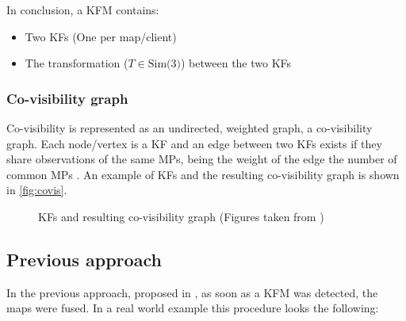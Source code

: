 In conclusion, a \ac{KFM} contains:
\begin{itemize}
  \item Two \acp{KF} (One per map/client)
  \item The transformation ($T \in \text{Sim(3)}$) between the two \acp{KF}
\end{itemize}

\subsubsection{Co-visibility graph}
Co-visibility is represented as an undirected, weighted graph, a co-visibility graph. Each node/vertex is a \ac{KF} and an edge between two \acp{KF} exists if they share observations of the same \acp{MP}, being the weight of the edge the number of common \acp{MP} \cite{Mur-Artal2015}. An example of \acp{KF} and the resulting co-visibility graph is shown in \autoref{fig:covis}.

\begin{figure}[H]
	\centering
	\quad
	\caption{\acp{KF} and resulting co-visibility graph (Figures taken from \cite{Mur-Artal2015})}
	\label{fig:covis}
\end{figure}

\subsection{Previous approach}
In the previous approach, proposed in \cite{Schmuck2017}, as soon as a \ac{KFM} was detected, the maps were fused. In a real world example this procedure looks the following:

